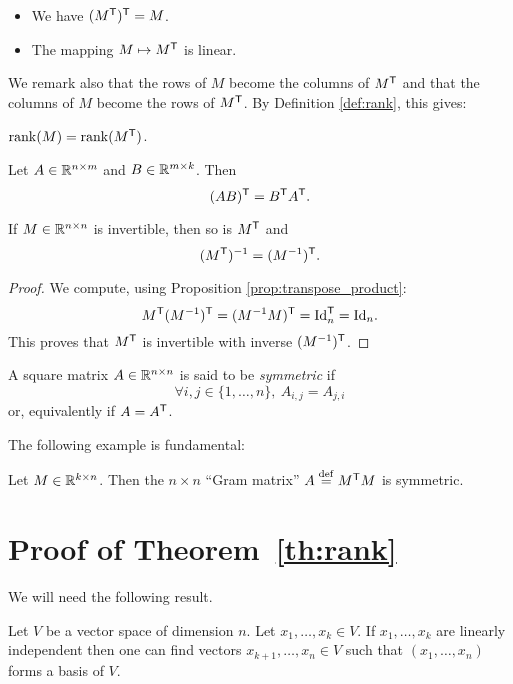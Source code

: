 \documentclass[11pt,nocut]{article}
\begin{document}
\begin{remark}
	\leavevmode
	\begin{itemize}
		\item We have $(M^{{\sf T}})^{{\sf T}} = M$. 
		\item The mapping $M \mapsto M^{{\sf T}}$ is linear.
	\end{itemize}
\end{remark}

We remark also that the rows of $M$ become the columns of $M^{{\sf T}}$ and that the columns of $M$ become the rows of $M^{{\sf T}}$. By Definition \ref{def:rank}, this gives:
\begin{proposition}
	${{\rm rank}}(M) = {{\rm rank}}(M^{{\sf T}})$.
\end{proposition}

\begin{proposition}\label{prop:transpose_product}
	Let $A \in \mathbb{R}^{n \times m}$ and $B \in \mathbb{R}^{m \times k}$. Then
	$$
	(AB)^{{\sf T}} = B^{{\sf T}} A^{{\sf T}}.
	$$
\end{proposition}

\begin{corollary}
	If $M \in \mathbb{R}^{n \times n}$ is invertible, then so is $M^{{\sf T}}$ and
	$$
	(M^{{\sf T}})^{-1} = (M^{-1})^{{\sf T}}.
	$$
\end{corollary}
\begin{proof}
	We compute, using Proposition \ref{prop:transpose_product}:
	$$
	M^{{\sf T}} (M^{-1})^{{\sf T}} = (M^{-1} M)^{{\sf T}} = {{\rm Id}}_n^{{\sf T}} = {{\rm Id}}_n.
	$$
	This proves that $M^{{\sf T}}$ is invertible with inverse $(M^{-1})^{{\sf T}}$.
\end{proof}


\begin{definition}
	A square matrix $A \in \mathbb{R}^{n \times n}$ is said to be \emph{symmetric} if
	$$
	\forall i,j \in \{1, \dots, n\}, \ A_{i,j} = A_{j,i}
	$$
	or, equivalently if $A = A^{{\sf T}}$.
\end{definition}

The following example is fundamental:
\begin{example}
	Let $M \in \mathbb{R}^{k \times n}$. Then the $n\times n$ ``Gram matrix'' $A \overset{\rm def}{=} M^{{\sf T}} M$ is symmetric.
\end{example}

\section*{Proof of Theorem~\ref{th:rank}}
	We will need the following result.
\begin{proposition}\label{prop:complete}
	Let $V$ be a vector space of dimension $n$.
	Let $x_1, \dots, x_k \in V$. 
	If $x_1, \dots, x_k$  are linearly independent then one can find vectors $x_{k+1}, \dots, x_{n} \in V$ such that $(x_1, \dots, x_n)$ forms a basis of $V$.
\end{proposition}
\end{document}
